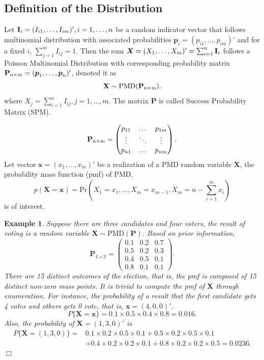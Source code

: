 \documentclass[12pt]{article}
\newcommand{\Ivec}{{\boldsymbol{\rm I}}}
\newcommand{\Xmat}{\mathbf{X}}
\newcommand{\Pmat}{\mathbf{P}}
\newcommand{\pvec}{\boldsymbol{p}}
\newcommand{\PMD}{\textrm{PMD}}
\newcommand{\Xvec}{\boldsymbol{X}}
\newcommand{\xvec}{\boldsymbol{x}}
\newcommand{\qedw}{\hfill \ensuremath{\Box}}
\newtheorem{example}{Example}
\begin{document}
\subsection{Definition of the Distribution}

Let $\Ivec_{i} = (I_{i1}, \dots, I_{im})', i=1, \dots, n$ be a random indicator vector that follows multinomial distribution with associated probabilities $\pvec_{i} = (p_{i1}, \dots, p_{im})'$ and for a fixed $i$, $\sum_{j=1}^{m} I_{ij}=1$. Then the sum $\Xvec = (X_{1}, \dots, X_{m})'= \sum_{i=1}^{n}\Ivec_{i}$ follows a Poisson Multinomial Distribution with corresponding probability matrix $\Pmat_{\rm n \times m} = (\pvec_{1}, \dots, \pvec_{n})'$, denoted it as
$$\Xmat \sim \PMD(\Pmat_{\rm n\times m}).$$ where $X_{j} = \sum_{i=1}^{n} I_{ij}, j=1,\dots,m$. The matrix $\Pmat$ is called Success Probability Matrix (SPM).

\begin{equation*}
\Pmat_{\rm n \times m} = \begin{pmatrix}
p_{11} &  \dots & p_{1m} \\
\vdots & \ddots & \vdots \\
p_{n1} &  \dots & p_{nm} \\
\end{pmatrix}.
\end{equation*}
Let vector $\xvec = (x_1,\dots,x_m)'$ be a realization of a $\PMD$ random variable $\Xmat$, the probability mass function (pmf) of PMD,
$$p(\Xmat=\xvec) = \text{Pr} \left( X_1 = x_1, \dots, X_m = x_{m-1}, X_{m} = n-\sum_{i=1}^{m}x_i \right)$$
is of interest.

\begin{example}\normalfont
Suppose there are three candidates and four voters, the result of voting is a random variable $\Xmat \sim \PMD(\Pmat)$. Based on prior information,
\begin{equation*}
\Pmat_{4 \times 3} = \begin{pmatrix}
0.1 &  0.2 & 0.7\\
0.5 & 0.2 & 0.3\\
0.4 &  0.5 & 0.1\\
0.8 & 0.1 & 0.1
\end{pmatrix}.
\end{equation*}
There are 15 distinct outcomes of the election, that is, the pmf is composed of 15 distinct non-zero mass points. It is trivial to compute the pmf of $\Xmat$ through enumeration. For instance, the probability of a result that the first candidate gets 4 votes and others gets 0 vote, that is, $\xvec =  (4,0,0)'$.
\begin{equation*}
P\{\Xmat = \xvec \} = 0.1\times 0.5 \times 0.4 \times 0.8 = 0.016.
\end{equation*}
Also, the probability of $\Xmat=(1,3,0)'$ is
\begin{align*}
P\{\Xmat = (1,3,0)\}  =  & 0.1\times 0.2 \times 0.5 \times 0.1 +
 0.5\times0.2\times0.5 \times 0.1 \\
 & + 0.4\times0.2\times0.2\times0.1 + 0.8\times0.2\times0.2\times0.5 = 0.0236.
\end{align*}
\qedw
\end{example}
\end{document}
